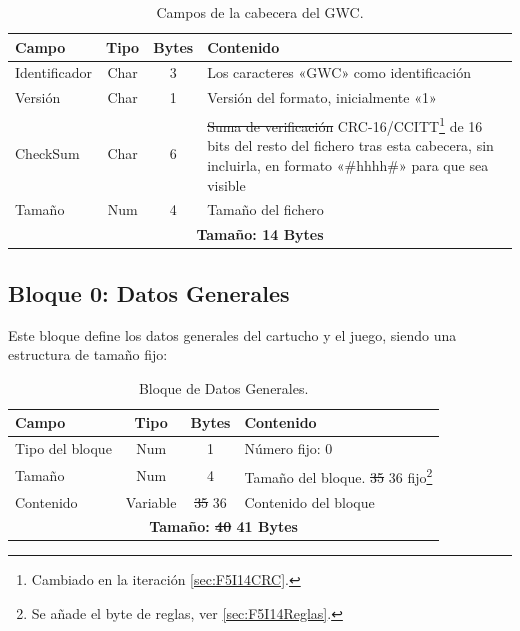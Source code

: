 \begin{table}[H]
	\centering
	\begin{tabular}{|l|c|c|p{8.4cm}|}
		\hline
		\textbf{Campo} & \textbf{Tipo} & \textbf{Bytes} & \textbf{Contenido} \\
		\hline
		
		Identificador & Char & 3 & Los caracteres «GWC» como identificación \\ \hline
		
		Versión & Char & 1 & Versión del formato, inicialmente «1» \\ \hline
		
		CheckSum & Char & 6 & \sout{Suma de verificación} CRC-16/CCITT\footnote{Cambiado en la iteración \ref{sec:F5I14CRC}.} de 16 bits del resto del fichero tras esta cabecera, sin incluirla, en formato «\#hhhh\#» para que sea visible\footnotemark \\ \hline
		
		Tamaño & Num & 4 & Tamaño del fichero \\ \hline	
		\hline\hline
		\multicolumn{4}{c}{\textbf{Tamaño: 14 Bytes}} \\ \hline
	\end{tabular}
	\caption{Campos de la cabecera del GWC.}
	\label{tab:A02CabeceraGWC}
\end{table}


\subsection{Bloque 0: Datos Generales}
\label{sec:A02GWCBl0}

Este bloque define los datos generales del cartucho y el juego, siendo una estructura de tamaño fijo:

\begin{table}[htbp]
	\centering
	\begin{tabular}{|l|c|c|p{8.4cm}|}
		\hline
		\textbf{Campo} & \textbf{Tipo} & \textbf{Bytes} & \textbf{Contenido} \\
		\hline
		Tipo del bloque & Num & 1 & Número fijo: 0\\
		\hline
		
		Tamaño & Num & 4 & Tamaño del bloque. \sout{35} 36 fijo\footnote{Se añade el byte de reglas, ver \ref{sec:F5I14Reglas}.} \\
		\hline
		
		Contenido & Variable & \sout{35} 36 & Contenido del bloque \\
		
		\hline\hline
		\multicolumn{4}{c}{\textbf{Tamaño: \sout{40} 41 Bytes}} \\ \hline
	\end{tabular}
	\caption{Bloque de Datos Generales.}
\end{table}

